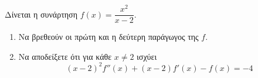 Δίνεται η συνάρτηση $ f(x)=\dfrac{x^2}{x-2} $.
\begin{enumerate}
\item Nα βρεθεούν οι πρώτη και η δεύτερη παράγωγος της $ f $.
\item Να αποδείξετε ότι για κάθε $ x\neq 2 $ ισχύει
\[ (x-2)^2f''(x)+(x-2)f'(x)-f(x)=-4 \]
\end{enumerate}
